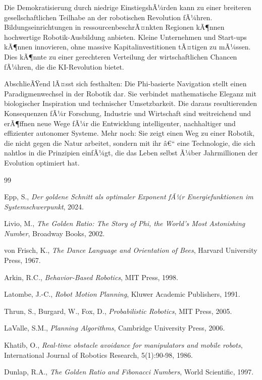 ﻿\documentclass[a4paper,12pt]{article}
\theoremstyle{definition}
\begin{document}
Die Demokratisierung durch niedrige EinstiegshÃ¼rden kann zu einer breiteren gesellschaftlichen Teilhabe an der robotischen Revolution fÃ¼hren. Bildungseinrichtungen in ressourcenbeschrÃ¤nkten Regionen kÃ¶nnen hochwertige Robotik-Ausbildung anbieten. Kleine Unternehmen und Start-ups kÃ¶nnen innovieren, ohne massive Kapitalinvestitionen tÃ¤tigen zu mÃ¼ssen. Dies kÃ¶nnte zu einer gerechteren Verteilung der wirtschaftlichen Chancen fÃ¼hren, die die KI-Revolution bietet.

AbschlieÃŸend lÃ¤sst sich festhalten: Die Phi-basierte Navigation stellt einen Paradigmenwechsel in der Robotik dar. Sie verbindet mathematische Eleganz mit biologischer Inspiration und technischer Umsetzbarkeit. Die daraus resultierenden Konsequenzen fÃ¼r Forschung, Industrie und Wirtschaft sind weitreichend und erÃ¶ffnen neue Wege fÃ¼r die Entwicklung intelligenter, nachhaltiger und effizienter autonomer Systeme. Mehr noch: Sie zeigt einen Weg zu einer Robotik, die nicht gegen die Natur arbeitet, sondern mit ihr â€“ eine Technologie, die sich nahtlos in die Prinzipien einfÃ¼gt, die das Leben selbst Ã¼ber Jahrmillionen der Evolution optimiert hat.

\begin{thebibliography}{99}
	
	Epp, S.,
	\textit{Der goldene Schnitt als optimaler Exponent fÃ¼r Energiefunktionen im Systemschwerpunkt},
	2024.
	
	Livio, M.,
	\textit{The Golden Ratio: The Story of Phi, the World's Most Astonishing Number},
	Broadway Books, 2002.
	
	von Frisch, K.,
	\textit{The Dance Language and Orientation of Bees},
	Harvard University Press, 1967.
	
	Arkin, R.C.,
	\textit{Behavior-Based Robotics},
	MIT Press, 1998.
	
	Latombe, J.-C.,
	\textit{Robot Motion Planning},
	Kluwer Academic Publishers, 1991.
	
	Thrun, S., Burgard, W., Fox, D.,
	\textit{Probabilistic Robotics},
	MIT Press, 2005.
	
	LaValle, S.M.,
	\textit{Planning Algorithms},
	Cambridge University Press, 2006.
	
	Khatib, O.,
	\textit{Real-time obstacle avoidance for manipulators and mobile robots},
	International Journal of Robotics Research, 5(1):90-98, 1986.
	
	Dunlap, R.A.,
	\textit{The Golden Ratio and Fibonacci Numbers},
	World Scientific, 1997.
	
\end{thebibliography}
\end{document}
